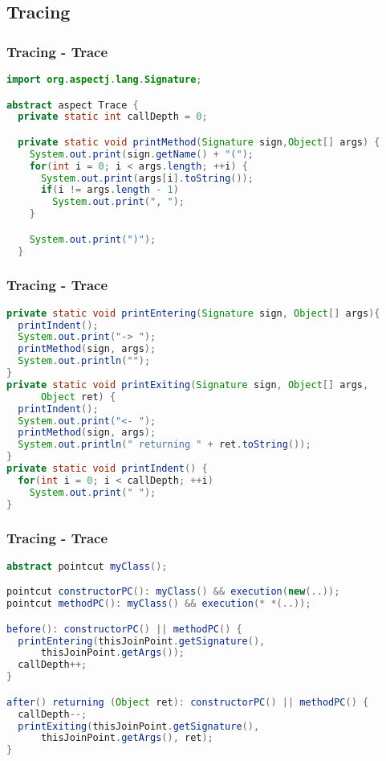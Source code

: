 \documentclass[11pt]{beamer}
\begin{document}
\subsection*{Tracing}
\begin{frame}[fragile]
   \frametitle{Tracing - Trace}
   {\scriptsize
   \begin{lstlisting}[language=java]
import org.aspectj.lang.Signature;

abstract aspect Trace {
  private static int callDepth = 0;

  private static void printMethod(Signature sign,Object[] args) {
    System.out.print(sign.getName() + "(");
    for(int i = 0; i < args.length; ++i) {
      System.out.print(args[i].toString());
      if(i != args.length - 1)
        System.out.print(", ");
    }

    System.out.print(")");
  }
   \end{lstlisting}}
\end{frame}

\begin{frame}[fragile]
   \frametitle{Tracing - Trace}
   {\scriptsize
   \begin{lstlisting}[language=java]
private static void printEntering(Signature sign, Object[] args){
  printIndent();
  System.out.print("-> ");
  printMethod(sign, args);
  System.out.println("");
}
private static void printExiting(Signature sign, Object[] args,
      Object ret) {
  printIndent();
  System.out.print("<- ");
  printMethod(sign, args);
  System.out.println(" returning " + ret.toString());
}
private static void printIndent() {
  for(int i = 0; i < callDepth; ++i)
    System.out.print(" ");
}
   \end{lstlisting}}
\end{frame}

\begin{frame}[fragile]
   \frametitle{Tracing - Trace}
   {\scriptsize
   \begin{lstlisting}[language=java]
abstract pointcut myClass();

pointcut constructorPC(): myClass() && execution(new(..));
pointcut methodPC(): myClass() && execution(* *(..));

before(): constructorPC() || methodPC() {
  printEntering(thisJoinPoint.getSignature(),
      thisJoinPoint.getArgs());
  callDepth++;
}

after() returning (Object ret): constructorPC() || methodPC() {
  callDepth--;
  printExiting(thisJoinPoint.getSignature(),
      thisJoinPoint.getArgs(), ret);
}
   \end{lstlisting}}
\end{frame}
\end{document}

